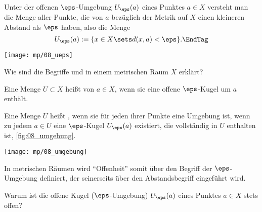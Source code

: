 \begin{antwort}
  Unter der offenen $\eps$-Umgebung $U_\eps(a)$ eines 
  Punktes $a\in X$ versteht man die Menge aller Punkte, die 
  von $a$ bezüglich der Metrik auf $X$ einen kleineren Abstand als 
  $\eps$ haben, also die Menge
  \begin{equation}
    U_\eps( a ) := \{ x\in X \sets d(x,a) < \eps \}. \EndTag
  \end{equation}

  \begin{center}
    \texttt{[image: mp/08\_ueps]}
    \label{fig:08_ueps}
  \end{center}
\end{antwort}

\begin{frage}\label{08_ofdef}
  Wie sind die Begriffe  
  und  in einem metrischen Raum $X$ erklärt?
\end{frage}

\begin{antwort}
  Eine Menge $U \subset X$ heißt  von $a\in X$, wenn 
  sie eine offene $\eps$-Kugel um $a$ enthält.

  Eine Menge $U$ heißt 
  , wenn sie für jeden ihrer Punkte eine Umgebung ist,  
  {\dasheisst} wenn zu jedem $a\in U$ eine $\eps$-Kugel $U_\eps(a)$ 
  existiert, die vollständig in $U$ enthalten ist, 
  \sieheAbbildung\ref{fig:08_umgebung}.

  \begin{center}
    \texttt{[image: mp/08\_umgebung]}
    \label{fig:08_umgebung}
  \end{center}

  In metrischen Räumen wird "`Offenheit"' somit über den Begriff der 
  $\eps$-Umgebung definiert, der seinerseits über den Abstandsbegriff 
  eingeführt wird. 
  \AntEnd
\end{antwort}

\begin{frage}
  Warum ist die offene Kugel 
  ($\eps$-Umgebung) $U_\eps(a)$ eines Punktes $a\in X$ stets offen?
\end{frage}

